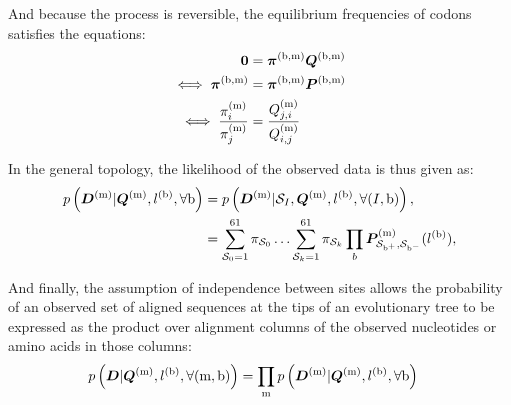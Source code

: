 And because the process is reversible, the equilibrium frequencies of \glspl{codon} satisfies the equations:
\begin{align}
\bm{0} & = \bm{\pi}^{(\text{b}, \text{m})} \bm{Q}^{(\text{b}, \text{m})} \\
\iff \bm{\pi}^{(\text{b}, \text{m})} & = \bm{\pi}^{(\text{b}, \text{m})} \bm{P}^{(\text{b}, \text{m})} \\
\iff \dfrac{\pi_{{i}}^{(\text{m})}}{\pi_{{j}}^{(\text{m})}} & = \dfrac{Q_{{j}, {i}}^{(\text{m})}}{Q_{{i}, {j}}^{(\text{m})}}
\end{align}

In the general topology, the \gls{likelihood} of the observed data is thus given as:
\begin{align}
p\left(\bm{D}^{(\text{m})}| \bm{Q}^{(\text{m})}, l^{(\text{b})}, \forall \text{b} \right) & = p\left(\bm{D}^{(\text{m})}| \mathcal{S}_{I}, \bm{Q}^{(\text{m})}, l^{(\text{b})}, \forall (I, \text{b}) \right), \\
& = \sum\limits_{\mathcal{S}_{0}=1}^{61} \pi_{\mathcal{S}_{0}} \hdots \sum\limits_{\mathcal{S}_{k}=1}^{61} \pi_{\mathcal{S}_{k}} \prod_{b} \bm{P}^{(\text{m})}_{\mathcal{S}_{\text{b}^{+}}, \mathcal{S}_{\text{b}^{-}}}(l^{(\text{b})}), \label{eq:likelihood-site}
\end{align}

And finally, the assumption of independence between sites allows the probability of an observed set of aligned sequences at the tips of an evolutionary tree to be expressed as the product over alignment columns of the observed nucleotides or amino acids in those columns:
\begin{align}
p\left(\bm{D}| \bm{Q}^{(\text{m})}, l^{(\text{b})}, \forall (\text{m}, \text{b}) \right) & = \prod_{\text{m}} p\left(\bm{D}^{(\text{m})}| \bm{Q}^{(\text{m})}, l^{(\text{b})}, \forall \text{b} \right) \label{eq:likelihood}
\end{align} 
